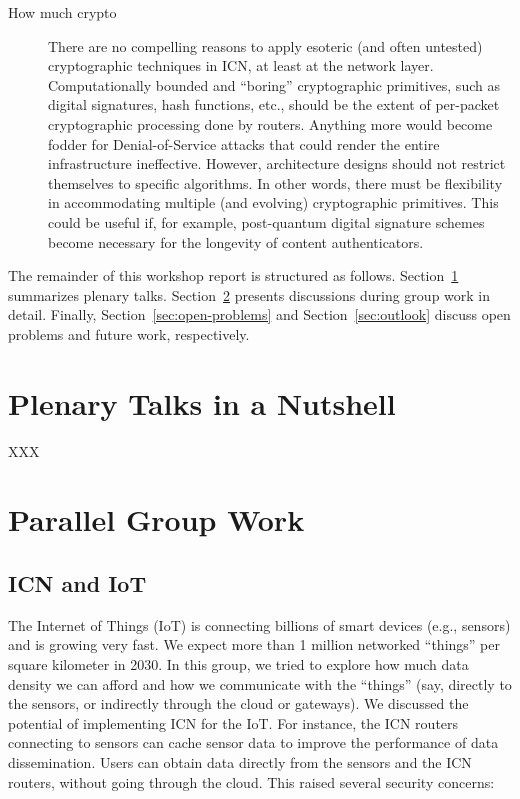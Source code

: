 \documentclass{sig-alternate-10pt}
\begin{document}
\begin{description}
  \item[How much crypto] There are no compelling reasons to apply esoteric (and often untested)
cryptographic techniques in ICN, at least at the network layer. Computationally bounded
and ``boring'' cryptographic primitives, such as digital signatures, hash functions, etc.,
should be the extent of per-packet cryptographic processing done by routers. Anything
more would become fodder for Denial-of-Service attacks that could render the entire
infrastructure ineffective. However, architecture designs should not restrict themselves
to specific algorithms. In other words, there must be flexibility in accommodating
multiple (and evolving) cryptographic primitives. This could be useful if, for example,
post-quantum digital signature schemes become necessary for the longevity of content authenticators.

\end{description}

The remainder of this workshop report is structured as follows.
Section~\ref{sec:plenary-talks} summarizes plenary talks.
Section~\ref{sec:group-work} presents discussions during group work in detail.
Finally, Section~\ref{sec:open-problems} and Section~\ref{sec:outlook} discuss open problems and future work, respectively.

\section{Plenary Talks in a Nutshell}
\label{sec:plenary-talks}
XXX

\section{Parallel Group Work}
\label{sec:group-work}
\subsection{ICN and IoT}

The Internet of Things (IoT) is connecting billions of smart devices (e.g., sensors) and is growing very fast. We expect more than 1 million networked ``things'' per square kilometer in 2030. In this group, we tried to explore how much data density we can afford
and how we communicate with the ``things'' (say, directly to the sensors, or indirectly through the cloud or gateways). We discussed the potential of implementing ICN for the IoT. For instance, the ICN routers connecting to sensors can cache sensor data to improve the performance of data dissemination. Users can obtain data directly from the sensors and the ICN routers, without going through the cloud. This raised several security concerns:
\end{document}
